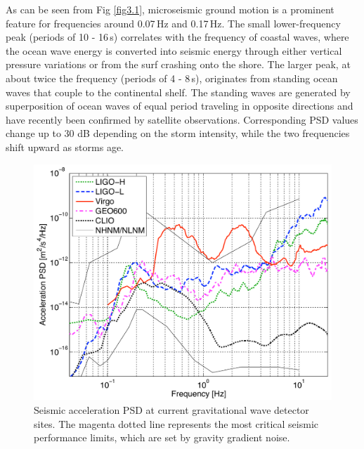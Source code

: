 As can be seen from Fig \ref{fig3.1}, microseismic ground motion is a prominent feature for frequencies around 0.07\,Hz and 0.17\,Hz. The small lower-frequency peak (periods of 10 - 16\,s) correlates with the frequency of coastal waves, where the ocean wave energy is converted into seismic energy through either vertical pressure variations or from the surf crashing onto the shore. The larger peak, at about twice the frequency (periods of 4 - 8\,s), originates from standing ocean waves that couple to the continental shelf. The standing waves are generated by superposition of ocean waves of equal period traveling in opposite directions and have recently been confirmed by satellite observations. Corresponding PSD values change up to 30 dB depending on the storm intensity, while the two frequencies shift upward as storms age.
\begin{figure}[t!]
	\begin{center}
		\includegraphics[width=15cm]{./Sec_SiteInfra/Figures/GWD_spectra3.pdf}
		\caption{Seismic acceleration PSD at current gravitational wave detector sites. The magenta dotted line represents the most critical seismic performance limits, which are set by gravity gradient noise.}
		\label{fig3.2}
	\end{center}
\end{figure}


